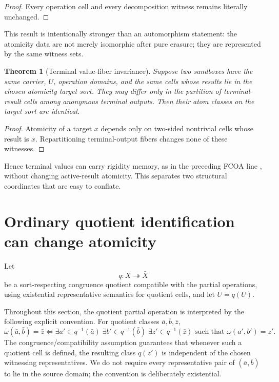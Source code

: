 \documentclass[11pt]{article}
\newtheorem{theorem}{Theorem}[section]
\theoremstyle{definition}
\theoremstyle{remark}
\begin{document}
\begin{proof}
Every operation cell and every decomposition witness remains literally unchanged.
\end{proof}

This result is intentionally stronger than an automorphism statement: the atomicity data are not merely isomorphic after pure erasure; they are represented by the same witness sets.

\begin{theorem}[Terminal value-fiber invariance]
Suppose two sandboxes have the same carrier, \(U\), operation domains, and the same cells whose results lie in the chosen atomicity target sort. They may differ only in the partition of terminal-result cells among anonymous terminal outputs. Then their atom classes on the target sort are identical.
\end{theorem}

\begin{proof}
Atomicity of a target \(x\) depends only on two-sided nontrivial cells whose result is \(x\). Repartitioning terminal-output fibers changes none of these witnesses.
\end{proof}

Hence terminal values can carry rigidity memory, as in the preceding FCOA line \cite{MalachevskyFCOA2026}, without changing active-result atomicity. This separates two structural coordinates that are easy to conflate.

\section{Ordinary quotient identification can change atomicity}

Let
\[
q:X\twoheadrightarrow\bar X
\]
be a sort-respecting congruence quotient compatible with the partial operations, using existential representative semantics for quotient cells, and let \(\bar U=q(U)\).

Throughout this section, the quotient partial operation is interpreted by the following explicit convention. For quotient classes \(\bar a,\bar b,\bar z\),
\begin{equation}
\boxed{
\bar\omega(\bar a,\bar b)=\bar z
\iff
\exists a'\in q^{-1}(\bar a)\;\exists b'\in q^{-1}(\bar b)\;\exists z'\in q^{-1}(\bar z)
\text{ such that }\omega(a',b')=z'.}
\label{eq:quotsem}
\end{equation}
The congruence/compatibility assumption guarantees that whenever such a quotient cell is defined, the resulting class \(q(z')\) is independent of the chosen witnessing representatives. We do not require every representative pair of \((\bar a,\bar b)\) to lie in the source domain; the convention is deliberately existential.
\end{document}
